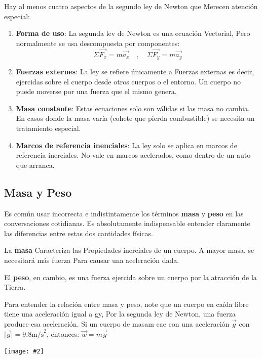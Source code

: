 \documentclass{article}
\newcommand{\newsubsection}[1]{
    \vspace{0.5cm}
    \color{sectionColor}
    \subsection{ #1}
    \color{black}
    \vspace{0.5cm}
}
\newcommand{\bl}[1]{\textbf{#1}}
\newcommand{\ladoALado}[4]{
    \begin{minipage}[t]{#3\textwidth}
        \vspace{0pt}
        #1
    \end{minipage}
    \hfill
    \begin{minipage}[t]{#4\textwidth}
        \vspace{0pt}
        \centering
        \texttt{[image: \#2]}
    \end{minipage}
}
\begin{document}
    \par Hay al menos cuatro aspectos de la segundo ley de Newton que Merecen atención especial:

    \begin{enumerate}
        \item \bl{Forma de uso}: La segunda lev de Newton es una ecuación Vectorial, Pero normalmente se usa descompuesta por componentes:
        \[\Sigma \vec{F_x} = m \vec{a_x} \quad , \quad \Sigma \vec{F_y} = m \vec{a_y}\]

        \item \bl{Fuerzas externes}: La ley se refiere únicamente a Fuerzas externas es decir, ejercidas sobre el cuerpo desde otros cuerpos o el entorno. Un cuerpo no puede moverse por una fuerza que el mismo genera.
        \item \bl{Masa constante}: Estas ecuaciones solo son válidas si las masa no cambia. En casos donde la masa varía (cohete que pierda combustible) se necesita un tratamiento especial.
        \item \bl{Marcos de referencia inenciales}: La ley solo se aplica en marcos de referencia inerciales. No vale en marcos acelerados, como dentro de un auto que arranca.
    \end{enumerate}

    \newsubsection{Masa y Peso}

    \ladoALado{
        \par Es común usar incorrecta e indistintamente los términos \bl{masa} y \bl{peso} en las conversaciones cotidianas. Es absolutamente indispensable entender claramente las diferencias entre estas dos cantidades físicas.

        \par La \bl{masa} Caracteriza las Propiedades inerciales de un cuerpo. A mayor masa, se necesitará más fuerza Para causar una aceleración dada.

        \par El \bl{peso}, en cambio, es una fuerza ejercida sobre un cuerpo por la atracción de la Tierra.

        \par Para entender la relación entre masa y peso, note que un cuerpo en caída libre tiene una aceleración igual a gy, Por la segunda ley de Newton, una fuerza produce esa aceleración. Si un cuerpo de masam cae con una aceleración $\vec{g}$ con $ \lvert \vec{g} \rvert = 9.8 \text{m/s}^2 $, entonces: $\vec{w} = m \vec{g}$
    }{img/2.4-1.png}{0.7}{0.3}
\end{document}
